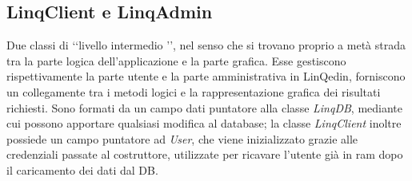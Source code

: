 \subsection*{LinqClient e LinqAdmin}
Due classi di \lq\lq livello intermedio \rq\rq, nel senso che si trovano proprio a metà strada tra la parte logica dell'applicazione e la parte grafica.
Esse gestiscono rispettivamente la parte utente e la parte amministrativa in LinQedin, forniscono un collegamente tra i metodi logici e la rappresentazione
grafica dei risultati richiesti. Sono formati da un campo dati puntatore alla classe \textit{LinqDB}, mediante cui possono apportare qualsiasi modifica al database;
la classe \textit{LinqClient} inoltre possiede un campo puntatore ad \textit{User}, che viene inizializzato grazie alle credenziali passate al costruttore, utilizzate
per ricavare l'utente già in ram dopo il caricamento dei dati dal DB.